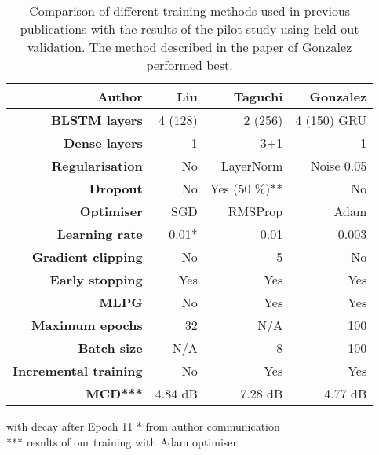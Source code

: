\documentclass[a4paper]{article}
\begin{document}
%

\begin{table}[th]
  \caption{Comparison of different training methods used in previous publications with the
    results of the pilot study using held-out validation. The method described in the paper of
  Gonzalez performed best.}
  \vspace{1em}
  \label{tab:architectures}
  \centering
  \footnotesize

  \begin{tabular}{ r r r r }
    \toprule
    \textbf{Author} & \textbf{Liu} & \textbf{Taguchi} & \textbf{Gonzalez} \\
    \midrule
    \textbf{BLSTM layers} & 4 (128) & 2 (256) & 4 (150) GRU \\
    \textbf{Dense layers} & 1 & 3+1 & 1 \\
    \textbf{Regularisation} & No & LayerNorm & Noise 0.05 \\
    \textbf{Dropout} & No & Yes (50 \%)** & No \\
    \textbf{Optimiser} & SGD & RMSProp & Adam \\
    \textbf{Learning rate} & 0.01* & 0.01 & 0.003 \\
    \textbf{Gradient clipping} & No & 5 & No \\
    \textbf{Early stopping} & Yes & Yes & Yes \\
    \textbf{MLPG} \cite{Wu2016} & No & Yes & Yes \\ 
    \textbf{Maximum epochs} & 32 & N/A & 100 \\
    \textbf{Batch size} & N/A & 8 & 100 \\
    \textbf{Incremental training} & No & Yes & Yes \\
    \textbf{MCD***} & 4.84 dB & 7.28 dB & 4.77 dB \\
    \bottomrule
  \end{tabular}
  \scriptsize * with decay after Epoch 11 \scriptsize ** from author communication \\
  *** results of our training with Adam optimiser
  \vspace{-2em}
\end{table}
\end{document}
